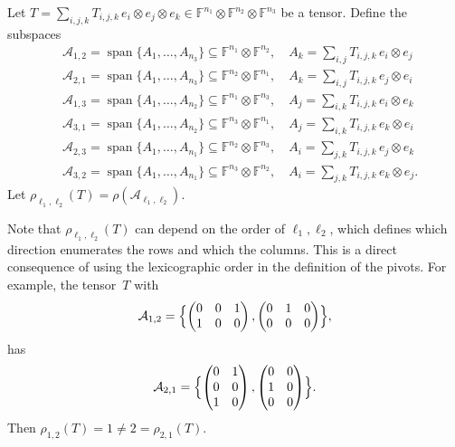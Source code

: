 \documentclass{daj}
\newcommand{\FF}{\mathbb{F}}
\DeclareMathOperator{\linspan}{span}
\begin{document}
\begin{definition}\label{def:pivots-tensors}
    Let $T = \sum_{i,j,k} T_{i,j,k}\, e_i \otimes e_j \otimes e_k \in \FF^{n_1} \otimes \FF^{n_2} \otimes \FF^{n_3}$ be a tensor.
    Define the subspaces
    \begin{align*}
        &\mathcal{A}_{1,2} = \linspan \{A_1, \ldots, A_{n_3}\} \subseteq \FF^{n_1} \otimes \FF^{n_2},\quad A_k = \sum_{i,j} T_{i,j,k}\, e_i \otimes e_j\\
        &\mathcal{A}_{2,1} = \linspan \{A_1, \ldots, A_{n_3}\} \subseteq \FF^{n_2} \otimes \FF^{n_1},\quad A_k = \sum_{i,j} T_{i,j,k}\, e_j \otimes e_i\\
        &\mathcal{A}_{1,3} = \linspan \{A_1, \ldots, A_{n_2}\} \subseteq \FF^{n_1} \otimes \FF^{n_3},\quad A_j = \sum_{i,k} T_{i,j,k}\, e_i \otimes e_k\\
        &\mathcal{A}_{3,1} = \linspan \{A_1, \ldots, A_{n_2}\} \subseteq \FF^{n_3} \otimes \FF^{n_1},\quad A_j = \sum_{i,k} T_{i,j,k}\, e_k \otimes e_i\\
        &\mathcal{A}_{2,3} = \linspan \{A_1, \ldots, A_{n_1}\} \subseteq \FF^{n_2} \otimes \FF^{n_3},\quad A_i = \sum_{j,k} T_{i,j,k}\, e_j \otimes e_k\\
        &\mathcal{A}_{3,2} = \linspan \{A_1, \ldots, A_{n_1}\} \subseteq \FF^{n_3} \otimes \FF^{n_2},\quad A_i = \sum_{j,k} T_{i,j,k}\, e_k \otimes e_j.
    \end{align*}
%
%
    Let $\rho_{{\ell_1},{\ell_2}}(T) = \rho(\mathcal{A}_{{\ell_1},{\ell_2}})$.
\end{definition}

\begin{remark}
    Note that $\rho_{{\ell_1},{\ell_2}}(T)$ can depend on the order of ${\ell_1},{\ell_2}$, which defines which direction enumerates the rows and which the columns. This is a direct consequence of using the lexicographic order in the definition of the pivots. For example, the tensor~$T$ with %
    \[
    \mathcal{A}_{1,2} = \Bigl\{\begin{pmatrix}
        0&0&1\\
        1&0&0
    \end{pmatrix},\begin{pmatrix}
        0&1&0\\
        0&0&0
    \end{pmatrix}\Bigr\},
    \]
    has 
    \[
    \mathcal{A}_{2,1} = \Bigl\{\begin{pmatrix}
        0&1\\
        0&0\\
        1&0
    \end{pmatrix},\begin{pmatrix}
        0&0\\
        1&0\\
        0&0
    \end{pmatrix}\Bigr\}.
    \]
    Then $\rho_{1,2}(T)=1\neq2=\rho_{2,1}(T)$. %
\end{remark}
\end{document}
